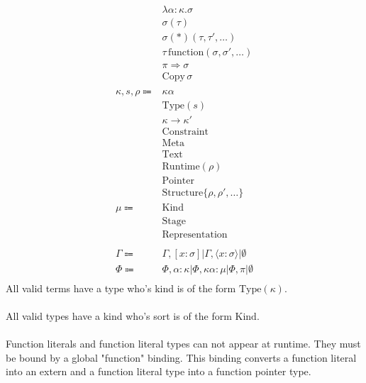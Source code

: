 \documentclass {article}
\begin{document}
\begin{align*}
& \lambda \alpha : \kappa. \sigma \tag*{[Type Operator]} \\
& \sigma (\tau) \tag*{[Type Construction]} \\
& \sigma (*) (\tau, \tau', \dots) \tag*{[Function Pointer]}\\
& \tau \, \text{function}(\sigma, \sigma', \dots) \tag*{[Function Literal Type]} \\
& \pi \Rightarrow \sigma \tag*{[Erased Qualified Type]} \\
& \text{Copy} \, \sigma \tag*{[Runtime Copyable Constraint]} \\
\\
\kappa, s, \rho \Coloneqq &  \kappa \alpha \tag*{[Kind Variable]} \\
& \text{Type} (s) \tag*{[Type]} \\
& \kappa \to \kappa' \tag*{[Higher Kinded Type]} \\
& \text{Constraint} \tag*{[Constraint]} \\
& \text{Meta} \tag*{[Meta Stage]}\\
& \text{Text} \tag*{[Symbol Stage]} \\
& \text{Runtime} (\rho) \tag*{[Runtime Stage]}\\
& \text{Pointer} \tag*{[Pointer Representation]}\\
& \text{Structure} \{ \rho, \rho', \dots \} \tag*{[Structure Representation]}
\\
\mu \Coloneqq & \text{Kind} \\
& \text{Stage} \\
& \text{Representation} \\
\\
\Gamma \Coloneqq & \Gamma, [x : \sigma] | \Gamma, \langle x : \sigma \rangle | \emptyset \\
\Phi \Coloneqq & \Phi, \alpha : \kappa | \Phi, \kappa \alpha : \mu | \Phi, \pi|  \emptyset \\
\end{align*}
All valid terms have a type who's kind is of the form $ \text{Type} (\kappa) $. \\
\\
All valid types have a kind who's sort is of the form $ \text{Kind} $.\\
\\
Function literals and function literal types can not appear at runtime. They must be bound by a global "function" binding.
This binding converts a function literal into an extern and a function literal type into a function pointer type. \\
\end{document}
